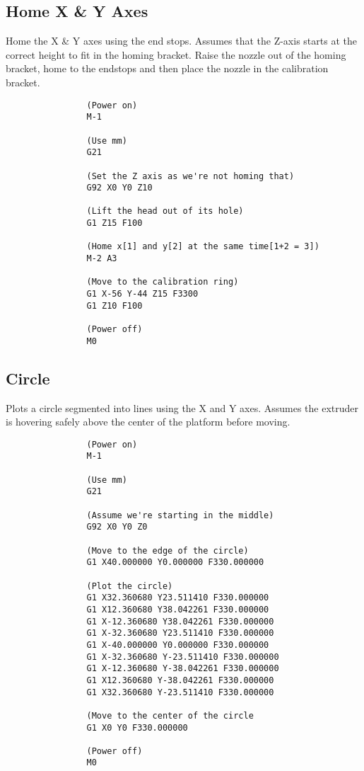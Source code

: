 		\subsection{Home X \& Y Axes}
			
			Home the X \& Y axes using the end stops. Assumes that the Z-axis starts at
			the correct height to fit in the homing bracket. Raise the nozzle out
			of the homing bracket, home to the endstops and then place the nozzle in
			the calibration bracket.
			
			\begin{verbatim}
				(Power on)
				M-1
				
				(Use mm)
				G21
				
				(Set the Z axis as we're not homing that)
				G92 X0 Y0 Z10
				
				(Lift the head out of its hole)
				G1 Z15 F100
				
				(Home x[1] and y[2] at the same time[1+2 = 3])
				M-2 A3
				
				(Move to the calibration ring)
				G1 X-56 Y-44 Z15 F3300
				G1 Z10 F100
				
				(Power off)
				M0
			\end{verbatim}
			
			\label{sec:gcode_home_xy}
		
		\subsection{Circle}
			
			Plots a circle segmented into lines using the X and Y axes. Assumes the
			extruder is hovering safely above the center of the platform before
			moving.
			
			\begin{verbatim}
				(Power on)
				M-1
				
				(Use mm)
				G21
				
				(Assume we're starting in the middle)
				G92 X0 Y0 Z0
				
				(Move to the edge of the circle)
				G1 X40.000000 Y0.000000 F330.000000
				
				(Plot the circle)
				G1 X32.360680 Y23.511410 F330.000000
				G1 X12.360680 Y38.042261 F330.000000
				G1 X-12.360680 Y38.042261 F330.000000
				G1 X-32.360680 Y23.511410 F330.000000
				G1 X-40.000000 Y0.000000 F330.000000
				G1 X-32.360680 Y-23.511410 F330.000000
				G1 X-12.360680 Y-38.042261 F330.000000
				G1 X12.360680 Y-38.042261 F330.000000
				G1 X32.360680 Y-23.511410 F330.000000
				
				(Move to the center of the circle
				G1 X0 Y0 F330.000000
				
				(Power off)
				M0
			\end{verbatim}

